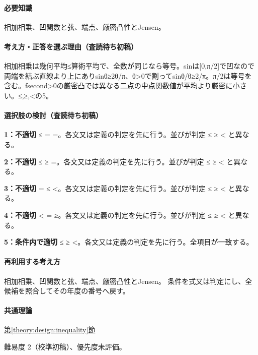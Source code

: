 \paragraph{必要知識} 相加相乗、凹関数と弦、端点、厳密凸性とJensen。

\paragraph{考え方・正答を選ぶ理由（査読待ち初稿）} 相加相乗は幾何平均≤算術平均で、全数が同じなら等号。sinは[0,π/2]で凹なので両端を結ぶ直線より上にありsinθ≥2θ/π、θ>0で割ってsinθ/θ≥2/π。π/2は等号を含む。fsecond>0の厳密凸では異なる二点の中点関数値が平均より厳密に小さい。≤,≥,<の5。

\paragraph{選択肢の検討（査読待ち初稿）}\mbox{}\par

\noindent\textbf{1：不適切} ≤ = =。各文又は定義の判定を先に行う。並びが判定 ≤ ≥ < と異なる。\par

\noindent\textbf{2：不適切} ≤ ≥ =。各文又は定義の判定を先に行う。並びが判定 ≤ ≥ < と異なる。\par

\noindent\textbf{3：不適切} = ≤ <。各文又は定義の判定を先に行う。並びが判定 ≤ ≥ < と異なる。\par

\noindent\textbf{4：不適切} < = ≥。各文又は定義の判定を先に行う。並びが判定 ≤ ≥ < と異なる。\par

\noindent\textbf{5：条件内で適切} ≤ ≥ <。各文又は定義の判定を先に行う。全項目が一致する。\par

\paragraph{再利用する考え方} 相加相乗、凹関数と弦、端点、厳密凸性とJensen。 条件を式又は判定にし、全候補を照合してその年度の番号へ戻す。

\paragraph{共通理論} \hyperref[theory:design:inequality]{第\ref*{theory:design:inequality}節}

\par 難易度 2（校準初稿）、優先度未評価。

